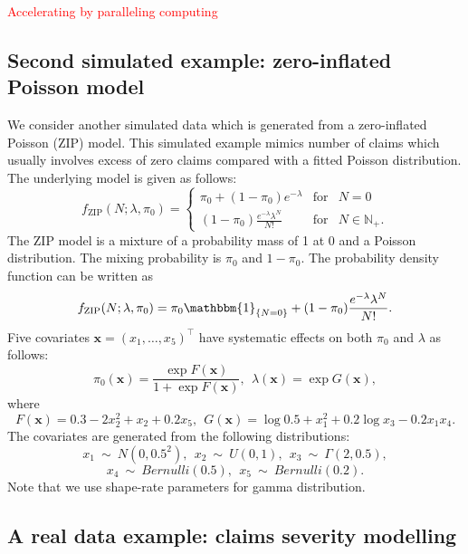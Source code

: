 \documentclass[11pt]{article}
\numberwithin{equation}{section}
\def\N{{\mathbb N}}  %
\def\bx{\boldsymbol{x}}
\newcommand{\red}[1]{\textcolor{red}{#1}}
\begin{document}
\red{Accelerating by paralleling computing}


\subsection{Second simulated example: zero-inflated Poisson model}

We consider another simulated data which is generated from a zero-inflated Poisson (ZIP) model. This simulated example mimics number of claims which usually involves excess of zero claims compared with a fitted Poisson distribution.
The underlying  model is given as follows:
 \begin{equation}
	f_{\text{ZIP}}(N;\lambda,\pi_0) = \left\{ 
	\begin{array}{ccl}
		\pi_0+(1-\pi_0)e^{-\lambda} & \mbox{for}
		& N=0 \\
		(1-\pi_0)\frac{e^{-\lambda}\lambda^N}{N!} & \mbox{for} &N\in\N_+.
	\end{array}\right.
\end{equation}
The ZIP model is a mixture of a probability mass of 1 at 0 and a Poisson distribution. The mixing probability is $\pi_0$ and $1-\pi_0$.
The probability density function can be written as
$$f_\text{ZIP}(N;\lambda,\pi_0)= \pi_0\mathbbm{1}_{\{N=0\}} + 
(1-\pi_0)\frac{e^{-\lambda}\lambda^N}{N!}.$$
Five covariates $\bx=(x_1,\ldots,x_5)^\top$ have systematic effects on both $\pi_0$ and $\lambda$ as follows:
\begin{equation}
	\pi_0(\bx)=\frac{\exp F(\bx)}{1+\exp F(\bx)}, ~~
	\lambda(\bx)=\exp G(\bx), 
\end{equation}
where
\begin{equation}
	 F(\bx)=0.3-2x_2^2+x_2+0.2x_5, ~~G(\bx)=\log 0.5+x_1^2 + 0.2\log x_3 - 0.2x_1 x_4.
\end{equation}
The covariates are generated from the following distributions:
$$	x_1~\sim~N(0,0.5^2), ~~ x_2~\sim~U(0,1), ~~ x_3~\sim~\Gamma(2,0.5),$$ $$x_4~\sim~Bernulli(0.5),~~ x_5~\sim~Bernulli(0.2).$$
Note that we use shape-rate parameters for gamma distribution.



\subsection{A real data example: claims severity modelling}
		
\end{document}
